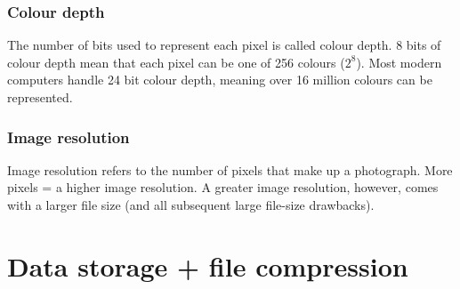 \documentclass[11pt]{article}
\begin{document}
\subsubsection{Colour depth}
\label{sec:org0c1181c}
The number of bits used to represent each pixel is called colour depth. 8 bits of colour depth mean that each pixel can be one of 256 colours (\(2^8\)). Most modern computers handle 24 bit colour depth, meaning over 16 million colours can be represented.
\subsubsection{Image resolution}
\label{sec:org113039b}
Image resolution refers to the number of pixels that make up a photograph. More pixels = a higher image resolution. A greater image resolution, however, comes with a larger file size (and all subsequent large file-size drawbacks).
\section{Data storage + file compression}
\label{sec:orga67c0ed}
\end{document}
